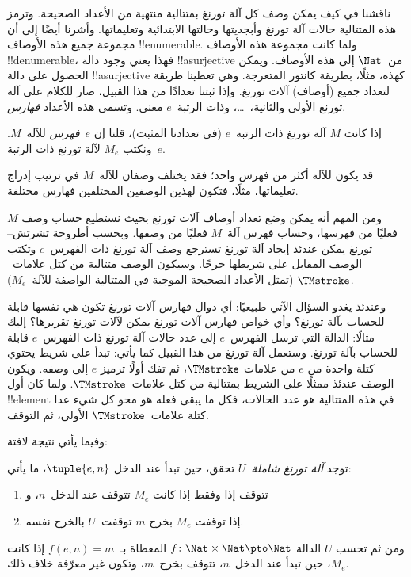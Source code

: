 \documentclass[../../../include/open-logic-section]{subfiles}
\begin{document}

ناقشنا في  كيف يمكن وصف كل آلة تورنغ بمتتالية منتهية
من الأعداد الصحيحة. وترمز هذه المتتالية حالات آلة تورنغ وأبجديتها
وحالتها الابتدائية وتعليماتها. وأشرنا أيضًا إلى أن مجموعة جميع هذه
الأوصاف !!{enumerable}. ولما كانت مجموعة هذه الأوصاف !!{denumerable}،
فهذا يعني وجود دالة !!a{surjective} من~$\Nat$ إلى هذه الأوصاف. ويمكن
الحصول على دالة !!a{surjective} كهذه، مثلًا، بطريقة كانتور المتعرجة.
وهي تعطينا طريقة لتعداد جميع (أوصاف) آلات تورنغ. وإذا ثبتنا تعدادًا من
هذا القبيل، صار للكلام على آلة تورنغ الأولى والثانية،~\dots، وذات
الرتبة~$e$ معنى. وتسمى هذه الأعداد \emph{فهارس}.

\begin{defn}
إذا كانت $M$ آلة تورنغ ذات الرتبة~$e$ (في تعدادنا المثبت)، قلنا إن
$e$~\emph{فهرس} للآلة~$M$. ونكتب $M_e$ لآلة تورنغ ذات الرتبة~$e$.
\end{defn}

قد يكون للآلة أكثر من فهرس واحد؛ فقد يختلف وصفان للآلة~$M$ في ترتيب
إدراج تعليماتها، مثلًا، فتكون لهذين الوصفين المختلفين فهارس مختلفة.

ومن المهم أنه يمكن وضع تعداد أوصاف آلات تورنغ بحيث نستطيع حساب وصف
$M$ فعليًا من فهرسها، وحساب فهرس آلة~$M$ فعليًا من وصفها. وبحسب أطروحة
تشرتش--تورنغ يمكن عندئذ إيجاد آلة تورنغ تسترجع وصف آلة تورنغ ذات
الفهرس~$e$ وتكتب الوصف المقابل على شريطها خرجًا. وسيكون الوصف متتالية
من كتل علامات~$\TMstroke$ (تمثل الأعداد الصحيحة الموجبة في المتتالية
الواصفة للآلة~$M_e$).

وعندئذ يغدو السؤال الآتي طبيعيًا: أي دوال فهارس آلات تورنغ تكون هي
نفسها قابلة للحساب بآلة تورنغ؟ وأي خواص فهارس آلات تورنغ يمكن لآلات
تورنغ تقريرها؟ إليك مثالًا: الدالة التي ترسل الفهرس~$e$ إلى عدد حالات
آلة تورنغ ذات الفهرس~$e$ قابلة للحساب بآلة تورنغ. وستعمل آلة تورنغ من
هذا القبيل كما يأتي: تبدأ على شريط يحتوي كتلة واحدة من $e$ من علامات
$\TMstroke$، ثم تفك أولًا ترميز $e$ إلى وصفه. ويكون الوصف عندئذ ممثلًا
على الشريط بمتتالية من كتل علامات~$\TMstroke$. ولما كان أول
!!{element} في هذه المتتالية هو عدد الحالات، فكل ما يبقى فعله هو محو
كل شيء عدا كتلة علامات~$\TMstroke$ الأولى، ثم التوقف.

وفيما يأتي نتيجة لافتة:

\begin{thm} توجد \emph{آلة تورنغ شاملة}~$U$
  تحقق، حين تبدأ عند الدخل $\tuple{e,n}$، ما يأتي:
  \begin{enumerate}
    \item تتوقف إذا وفقط إذا كانت $M_e$ تتوقف عند الدخل~$n$، و
    \item إذا توقفت $M_e$ بخرج $m$ توقفت~$U$ بالخرج نفسه.
  \end{enumerate}
  ومن ثم تحسب $U$ الدالة $f\colon\Nat\times\Nat\pto\Nat$ المعطاة
  بـ~$f(e,n)=m$ إذا كانت $M_e$، حين تبدأ عند الدخل~$n$، تتوقف بخرج~$m$،
  وتكون غير معرّفة خلاف ذلك.
\end{thm}
\end{document}
